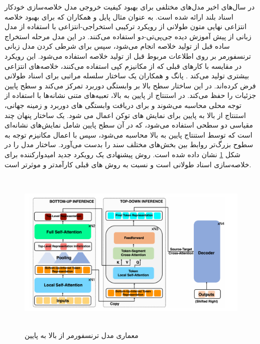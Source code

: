     در سال‌های اخیر مدل‌های مختلفی برای بهبود کیفیت خروجی مدل خلاصه‌سازی خودکار اسناد بلند ارائه شده است. به عنوان مثال  پایل
    و همکاران  که برای بهبود خلاصه انتزاعی نهایی متون طولانی از رویکرد ترکیبی استخراجی-انتزاعی با استفاده از مدل زبانی از پیش آموزش دیده جی‌پی‌تی-دو
     استفاده می‌کنند. در این مدل مرحله استخراج ساده قبل از تولید خلاصه انجام می‌شود، سپس برای شرطی کردن مدل زبانی ترنسفورمر بر روی اطلاعات مربوط قبل از تولید خلاصه استفاده می‌شود. این رویکرد در مقایسه با کارهای قبلی که از مکانیزم کپی استفاده می‌کنند، خلاصه‌های انتزاعی بیشتری تولید می‌کند
    \cite{pilault2020extractive}. 
     پانگ
    و همکاران یک ساختار سلسله مراتبی برای اسناد طولانی فرض کرده‌اند. در این ساختار سطح بالا بر وابستگی دوربرد تمرکز می‌کند و سطح پایین جزئیات را حفظ می‌کند. 
    در استنتاج از پایین به بالا، تعبیه‌های متنی نشانه‌ها با استفاده از توجه محلی محاسبه می‌شوند و  برای دریافت وابستگی های دوربرد و زمینه جهانی، استنتاج از بالا به پایین برای نمایش های توکن اعمال می شود. یک ساختار پنهان چند مقیاسی دو سطحی استفاده می‌شود، که در آن سطح پایین شامل نمایش‌های نشانه‌ای است که توسط استنتاج پایین به بالا محاسبه می‌شود، سپس با اعمال مکانیزم توجه به سطوح بزرگ‌تر روابط بین بخش‌های مختلف سند را بدست می‌آورد. ساختار مدل را در شکل  \ref{fig:top_down}  نشان داده شده است. روش پیشنهادی یک رویکرد جدید امیدوارکننده برای خلاصه‌سازی اسناد طولانی است و نسبت به روش های قبلی کارآمدتر و موثرتر است\cite{pang2023long}.

  \begin{figure}[!h]
  	\begin{center}
  		\includegraphics[height=8cm]{top_down.png}
  	\end{center}
  	\caption{ معماری مدل ترنسفورمر از بالا به پایین\cite{pang2023long}}
  	\label{fig:top_down}
  	\medskip
  	
  \end{figure}
  
